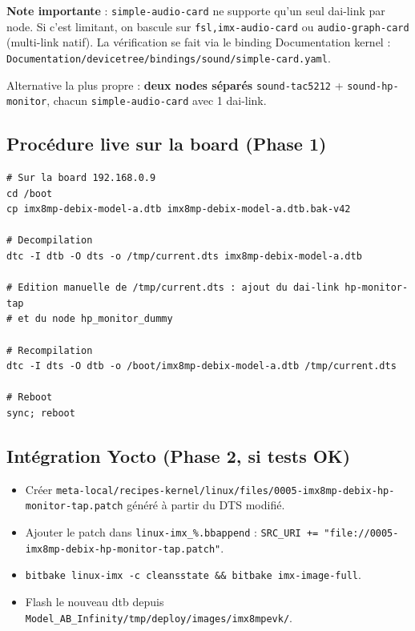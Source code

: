 \documentclass[11pt,a4paper]{article}
\begin{document}
\textbf{Note importante} : \texttt{simple-audio-card} ne supporte qu'un seul dai-link par node. Si c'est limitant, on bascule sur \texttt{fsl,imx-audio-card} ou \texttt{audio-graph-card} (multi-link natif). La vérification se fait via le binding Documentation kernel : \texttt{Documentation/devicetree/bindings/sound/simple-card.yaml}.

Alternative la plus propre : \textbf{deux nodes séparés} \texttt{sound-tac5212} + \texttt{sound-hp-monitor}, chacun \texttt{simple-audio-card} avec 1 dai-link.

\subsection{Procédure live sur la board (Phase 1)}

\begin{lstlisting}[language={}, basicstyle=\ttfamily\scriptsize]
# Sur la board 192.168.0.9
cd /boot
cp imx8mp-debix-model-a.dtb imx8mp-debix-model-a.dtb.bak-v42

# Decompilation
dtc -I dtb -O dts -o /tmp/current.dts imx8mp-debix-model-a.dtb

# Edition manuelle de /tmp/current.dts : ajout du dai-link hp-monitor-tap
# et du node hp_monitor_dummy

# Recompilation
dtc -I dts -O dtb -o /boot/imx8mp-debix-model-a.dtb /tmp/current.dts

# Reboot
sync; reboot
\end{lstlisting}

\subsection{Intégration Yocto (Phase 2, si tests OK)}

\begin{itemize}[leftmargin=*, itemsep=1pt]
  \item Créer \texttt{meta-local/recipes-kernel/linux/files/0005-imx8mp-debix-hp-monitor-tap.patch} généré à partir du DTS modifié.
  \item Ajouter le patch dans \texttt{linux-imx\_\%.bbappend} : \texttt{SRC\_URI += "file://0005-imx8mp-debix-hp-monitor-tap.patch"}.
  \item \texttt{bitbake linux-imx -c cleansstate \&\& bitbake imx-image-full}.
  \item Flash le nouveau dtb depuis \texttt{Model\_AB\_Infinity/tmp/deploy/images/imx8mpevk/}.
\end{itemize}
\end{document}
